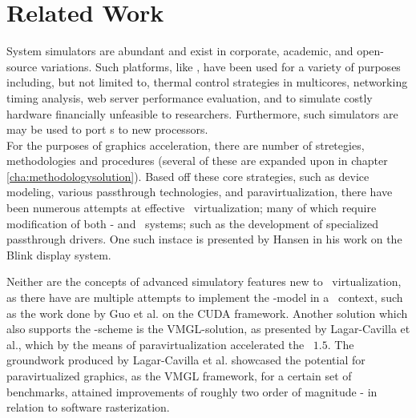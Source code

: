 

\chapter{Related Work}
\label{cha:relatedwork}
System simulators are abundant and exist in corporate, academic, and open-source variations.
Such platforms, like \dvttermsimics , have been used for a variety of purposes including, but not limited to, thermal control strategies in multicores, networking timing analysis, web server performance evaluation, and to simulate costly hardware financially unfeasible to researchers.
Furthermore, such simulators are may be used to port \dvttermos s to new processors.\\

\noindent
For the purposes of graphics acceleration, there are number of stretegies, methodologies and procedures (several of these are expanded upon in chapter \ref{cha:methodologysolution}).
Based off these core strategies, such as device modeling, various passthrough technologies, and paravirtualization, there have been numerous attempts at effective \dvttermgpu\ virtualization; many of which require modification of both \dvttermtarget - and \dvttermhost\ systems; such as the development of specialized passthrough drivers.
One such instace is presented by Hansen in his work on the Blink display system.

Neither are the concepts of advanced simulatory features new to \dvttermgpu\ virtualization, as there have are multiple attempts to implement the \dvttermcheckpointrestart -model in a \dvttermgpu\ context, such as the work done by Guo et al. on the CUDA framework.
Another solution which also supports the \dvttermcheckpointrestart -scheme is the VMGL-solution, as presented by Lagar-Cavilla et al., which by the means of paravirtualization accelerated the \dvttermopengl\ $1.5$.
The groundwork produced by Lagar-Cavilla et al. showcased the potential for paravirtualized graphics, as the VMGL framework, for a certain set of benchmarks, attained improvements of roughly two order of magnitude - in relation to software rasterization.

